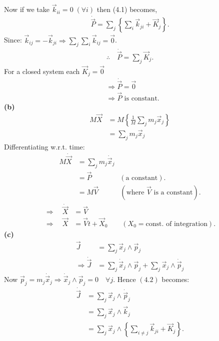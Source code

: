 \documentclass[12pt]{article}
\begin{document}
Now if we take $\vec{k}_{ii}=0\;(\forall i)$ then (4.1) becomes,
\begin{align*}
\dot{\vec{P}}
=
\sum_j\left\{
\sum_i \vec{k}_{ji}+\vec{K}_j
\right\}.
\end{align*}
\hspace*{1cm}Since: $\vec{k}_{ij}=-\vec{k}_{ji} \Rightarrow \sum_j\sum_i\vec{k}_{ij}=\vec{0}$.
\begin{align*}
\therefore\quad \dot{\vec{P}}=\sum_j\vec{K}_j.
\end{align*}
\hspace*{1cm}For a closed system each $\vec{K}_j=\vec{0}$
\begin{align*}
&\Rightarrow\dot{\vec{P}}=\vec{0} \\
&\Rightarrow\vec{P}\text{ is constant}.
\end{align*}
\vspace{1cm}
\noindent
\textbf{(b)}
\begin{align*}
M\vec{X}
&= M\left\{\frac{1}{M}\sum_j m_j\vec{x}_j\right\} \\
&= \sum_j m_j\vec{x}_j
\end{align*}
Differentiating w.r.t. time:
\begin{align*}
M\dot{\vec{X}}
&= \sum_j m_j\dot{\vec{x}}_j \\
&= \vec{P} \qquad\qquad (\text{a constant}). \\
&= M\vec{V} \qquad \;\;\;\; (\text{where }\vec{V}\text{ is a constant}).
\end{align*}
\begin{align*}
\Rightarrow\quad \dot{\vec{X}} &= \vec{V} \\
\Rightarrow\quad \vec{X} &= \vec{V}t+\vec{X}_0
\qquad (X_0=\text{const. of integration}).
\end{align*}
\noindent
\textbf{(c)}
\begin{align*}
\vec{J} &= \sum_j \vec{x}_j \wedge \vec{p}_j \\
\Rightarrow \dot{\vec{J}} &= \sum_j \dot{\vec{x}}_j \wedge \vec{p}_j + \sum_j \vec{x}_j \wedge \dot{\vec{p}}_j \tag{4.2}
\end{align*}
Now $\vec{p}_j=m_j\dot{\vec{x}}_j \Rightarrow \dot{\vec{x}}_j\wedge\vec{p}_j=0\quad\forall j$. Hence $(4.2)$ becomes:
\begin{align*}
\dot{\vec{J}}
&= \sum_j \vec{x}_j \wedge \dot{\vec{p}}_j \\
&= \sum_j \vec{x}_j \wedge \vec{k}_j \\
&= \sum_j \vec{x}_j \wedge
\left\{
\sum_{i\neq j}\vec{k}_{ji}+\vec{K}_j \tag{4.3}
\right\}.
\end{align*}
\end{document}
